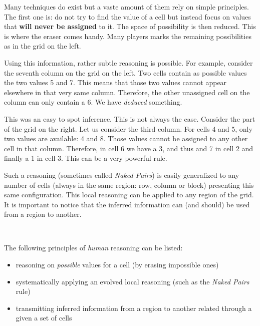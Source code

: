 
Many techniques do exist but a vaste amount of them rely on simple principles. The first one is: do not try to find the value of a cell but instead focus on values that \textbf{will never be assigned} to it. The space of possibility is then reduced. This is where the eraser comes handy. Many players marks the remaining possibilities as in the grid on the left. 

Using this information, rather subtle reasoning is possible. For example, consider the seventh column on the grid on the left. Two cells contain as possible values the two values 5 and 7. This means that those two values cannot appear elsewhere in that very same column. Therefore, the other unassigned cell on the column can only contain a 6. We have \emph{deduced} something.

\noindent\begin{minipage}[b]{0.8\linewidth}
This was an easy to spot inference. This is not always the case. Consider the part of the grid on the right. Let us consider the third column. For cells 4 and 5, only two values are available: 4 and 8. Those values cannot be assigned to any other cell in that column. Therefore, in cell 6 we have a 3, and thus and 7 in cell 2 and finally a 1 in cell 3. This can be a very powerful rule.

Such a reasoning (sometimes called \emph{Naked Pairs}) is easily generalized to any number of cells (always in the same region: row, column or block) presenting this same configuration. This local reasoning can be applied to any region of the grid. It is important to notice that the inferred information can (and should) be used from a region to another.   
\end{minipage}%
\begin{minipage}[m]{0.2\linewidth}
~~
\end{minipage}

\noindent The following principles of \emph{human} reasoning can be listed: 
\begin{itemize}
	\item reasoning on \emph{possible} values for a cell (by erasing impossible ones)
	\item systematically applying an evolved local reasoning (such as the \emph{Naked Pairs} rule)
	\item transmitting inferred information from a region to another related through a given a set of cells
\end{itemize}

